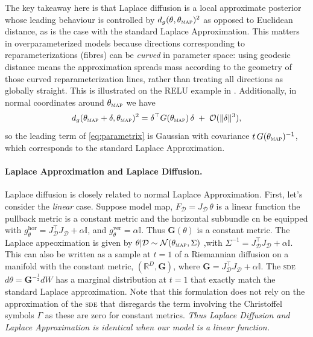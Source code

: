 The key takeaway here is that Laplace diffusion is a local approximate posterior whose
leading behaviour is controlled by $d_g(\theta,\theta_{\textsc{map}})^2$ as opposed to Euclidean distance, as is the case with the standard Laplace Approximation.
This matters in overparameterized models because directions corresponding to reparameterizations (fibres)
can be \emph{curved} in parameter space: using geodesic distance means the approximation spreads mass according to the geometry of those curved reparameterization lines, rather than treating all directions as globally straight. 
This is illustrated on the RELU example in . Additionally, in normal coordinates around $\theta_{\textsc{map}}$ we have
\begin{equation}
d_g(\theta_{\textsc{map}}+\delta,\theta_{\textsc{map}})^2
=
\delta^\top G(\theta_{\textsc{map}})\,\delta \;+\; \mathcal O(\|\delta\|^3),
\label{eq:dist_local_quad}
\end{equation}
so the leading term of \eqref{eq:parametrix} is Gaussian with covariance $t\,G(\theta_{\textsc{map}})^{-1}$, which corresponds to the standard Laplace Approximation. 




\paragraph{Laplace Approximation and Laplace Diffusion.}
Laplace diffusion is closely related to normal Laplace Approximation. 
First, let's consider the \emph{linear} case. Suppose model map, $F_\mathcal{D} = J_\mathcal{D} \,\theta$ is a linear function the pullback metric is a constant metric and the horizontal subbundle cn be equipped with  $g_\theta^\mathrm{hor} = J_\mathcal{D}^\top J_\mathcal{D} + \alpha \mathbb{I}$, and $g_\theta^\mathrm{ver} = \alpha \mathbb{I}$. Thus $\mathbf{G}(\theta)$ is a constant metric. The Laplace appeoximation is given by $\theta|\mathcal{D} \sim \mathcal{N}(\theta_{\textsc{map}}, \Sigma)$ ,with $\Sigma^{-1} = J_\mathcal{D}^\top J_\mathcal{D} + \alpha\mathbb{I}$.
This can also be written as a sample at $t=1$ of a Riemannian diffusion on a manifold with the constant metric, $(\mathbb{R}^D, \mathbf{G})$, where $\mathbf{G} = J_\mathcal{D}^\top J_\mathcal{D} + \alpha\mathbb{I}$. 
The \textsc{sde} $d\theta = \mathbf{G}^{-\frac{1}{2}} d W$ has a marginal distribution at $t=1$ that exactly match the standard Laplace approximation. 
Note that this formulation does not rely on the approximation of the \textsc{sde} that disregards the term involving the Christoffel symbols $\Gamma$ as these are zero for constant metrics. \emph{Thus Laplace Diffusion and Laplace Approximation is identical when our model is a linear function.}


